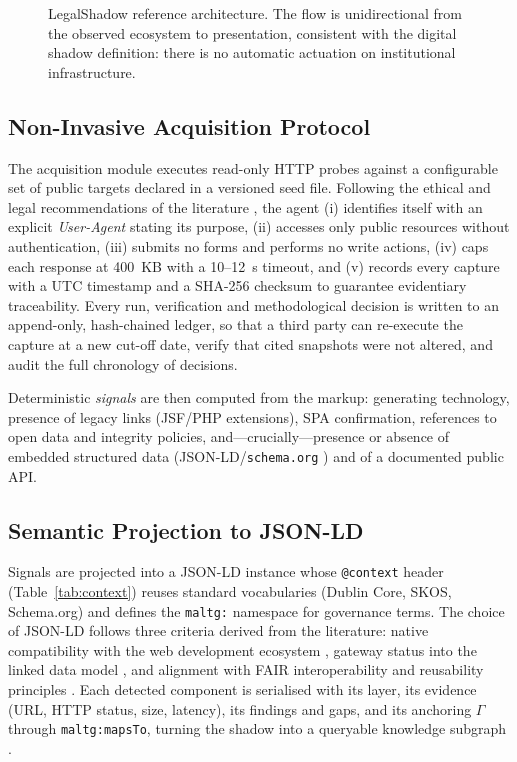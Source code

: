 \documentclass[engproc,article,submit,moreauthors]{Definitions/mdpi}
\begin{document}
\begin{figure}[H]
\caption{LegalShadow reference architecture. The flow is unidirectional from the observed ecosystem to presentation, consistent with the digital shadow definition: there is no automatic actuation on institutional infrastructure.\label{fig:arch}}
\end{figure}

\subsection{Non-Invasive Acquisition Protocol}
The acquisition module executes read-only HTTP probes against a configurable set of public targets declared in a versioned seed file. Following the ethical and legal recommendations of the literature \cite{Krotov2020}, the agent (i) identifies itself with an explicit \emph{User-Agent} stating its purpose, (ii) accesses only public resources without authentication, (iii) submits no forms and performs no write actions, (iv) caps each response at 400~KB with a 10--12~s timeout, and (v) records every capture with a UTC timestamp and a SHA-256 checksum to guarantee evidentiary traceability. Every run, verification and methodological decision is written to an append-only, hash-chained ledger, so that a third party can re-execute the capture at a new cut-off date, verify that cited snapshots were not altered, and audit the full chronology of decisions.

Deterministic \emph{signals} are then computed from the markup: generating technology, presence of legacy links (JSF/PHP extensions), SPA confirmation, references to open data and integrity policies, and---crucially---presence or absence of embedded structured data (JSON-LD/\texttt{schema.org} \cite{Guha2016}) and of a documented public API.

\subsection{Semantic Projection to JSON-LD}
Signals are projected into a JSON-LD instance whose \texttt{@context} header (Table~\ref{tab:context}) reuses standard vocabularies (Dublin Core, SKOS, Schema.org) and defines the \texttt{maltg:} namespace for governance terms. The choice of JSON-LD follows three criteria derived from the literature: native compatibility with the web development ecosystem \cite{Guha2016}, gateway status into the linked data model \cite{Bizer2009,Hitzler2021}, and alignment with FAIR interoperability and reusability principles \cite{Wilkinson2016}. Each detected component is serialised with its layer, its evidence (URL, HTTP status, size, latency), its findings and gaps, and its anchoring $\Gamma$ through \texttt{maltg:mapsTo}, turning the shadow into a queryable knowledge subgraph \cite{Hogan2021}.
\end{document}
